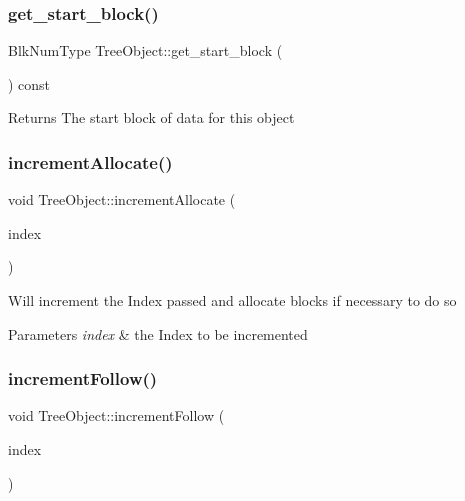 \subsubsection{\texorpdfstring{get\+\_\+start\+\_\+block()}{get\_start\_block()}}
{\footnotesize\ttfamily Blk\+Num\+Type Tree\+Object\+::get\+\_\+start\+\_\+block (\begin{DoxyParamCaption}{ }\end{DoxyParamCaption}) const}

\begin{DoxyReturn}{Returns}
The start block of data for this object 
\end{DoxyReturn}
\mbox{\label{classTreeObject_a0660e393ded8a24c5a7e211ad7891de3}} 
\subsubsection{\texorpdfstring{increment\+Allocate()}{incrementAllocate()}}
{\footnotesize\ttfamily void Tree\+Object\+::increment\+Allocate (\begin{DoxyParamCaption}\item[{\mbox{\hyperlink{structindex}{Index}} $\ast$}]{index }\end{DoxyParamCaption})}

Will increment the Index passed and allocate blocks if necessary to do so 
\begin{DoxyParams}{Parameters}
{\em index} & the Index to be incremented \\
\hline
\end{DoxyParams}
\mbox{\label{classTreeObject_a1a58b541ca7c6d442c0fd7a0f587cfdc}} 
\subsubsection{\texorpdfstring{increment\+Follow()}{incrementFollow()}}
{\footnotesize\ttfamily void Tree\+Object\+::increment\+Follow (\begin{DoxyParamCaption}\item[{\mbox{\hyperlink{structindex}{Index}} $\ast$}]{index }\end{DoxyParamCaption})}

